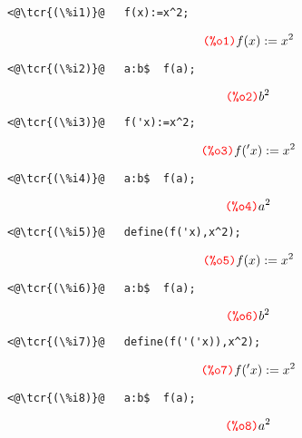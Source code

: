 \documentclass[../Maxima_Workbook.tex]{subfiles}
\begin{document}
\lz \begin{small}
\color{blue} \leqn
\begin{lstlisting}
<@\tcr{(\%i1)}@   f(x):=x^2;
\end{lstlisting}
\vspace{-5.5mm} 	\[ \tag*{\tcr{\ttfamily (\%o1)}} f(x):=x^2 \]
\vspace{-10.5mm} \begin{lstlisting}
<@\tcr{(\%i2)}@   a:b$  f(a);
\end{lstlisting}
\vspace{-5.5mm} \[ \tag*{\tcr{\ttfamily (\%o2)}} b^2 \]
\vspace{-10.5mm} 

\lzz \begin{lstlisting}
<@\tcr{(\%i3)}@   f('x):=x^2;
\end{lstlisting}
\vspace{-5.5mm} \[ \tag*{\tcr{\ttfamily (\%o3)}} f('x):=x^2 \]
\vspace{-10.5mm} \begin{lstlisting}
<@\tcr{(\%i4)}@   a:b$  f(a);
\end{lstlisting}
\vspace{-5.5mm} \[ \tag*{\tcr{\ttfamily (\%o4)}} a^2 \]
\vspace{-10.5mm} 

\lzz \begin{lstlisting}
<@\tcr{(\%i5)}@   define(f('x),x^2);
\end{lstlisting}
\vspace{-5.5mm} \[ \tag*{\tcr{\ttfamily (\%o5)}} f(x):=x^2 \]
\vspace{-10.5mm} \begin{lstlisting}
<@\tcr{(\%i6)}@   a:b$  f(a);
\end{lstlisting}
\vspace{-5.5mm} \[ \tag*{\tcr{\ttfamily (\%o6)}} b^2 \]
\vspace{-10.5mm} 

\lzz \begin{lstlisting}
<@\tcr{(\%i7)}@   define(f('('x)),x^2);
\end{lstlisting}
\vspace{-5.5mm} \[ \tag*{\tcr{\ttfamily (\%o7)}} f('x):=x^2 \]
\vspace{-10.5mm} \begin{lstlisting}
<@\tcr{(\%i8)}@   a:b$  f(a);
\end{lstlisting}
\vspace{-5.5mm} \[ \tag*{\tcr{\ttfamily (\%o8)}} a^2 \]
\color{black} \reqn
\end{small} \vspace{-5mm}
\end{document}
